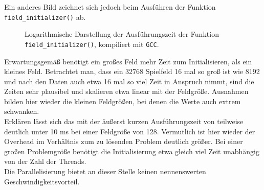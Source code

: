 \documentclass[german,plainarticle,hyperref,utf8]{zihpub}
\begin{document}
	Ein anderes Bild zeichnet sich jedoch beim Ausführen der Funktion \texttt{field\_initializer()} ab.
	\begin{figure}[h]
		\begin{center}
			
		\end{center}
		\caption{Logarithmische Darstellung der Ausführungszeit der Funktion \texttt{field\_initializer()}, kompiliert mit \texttt{GCC}.}
	\end{figure}
	\newline
	Erwartungsgemäß benötigt ein großes Feld mehr Zeit zum Initialisieren, als ein kleines Feld. Betrachtet man, dass ein 32768 Spielfeld 16 mal so groß ist wie 8192 und nach den Daten auch etwa 16 mal so viel Zeit in Anspruch nimmt, sind die Zeiten sehr plausibel und skalieren etwa linear mit der Feldgröße. Ausnahmen bilden hier wieder die kleinen Feldgrößen, bei denen die Werte auch extrem schwanken.\\
	Erklären lässt sich das mit der äußerst kurzen Ausführungszeit von teilweise deutlich unter 10 ms bei einer Feldgröße von 128. Vermutlich ist hier wieder der Overhead im Verhältnis zum zu lösenden Problem deutlich größer.
	Bei einer großen Problemgröße benötigt die Initialisierung etwa gleich viel Zeit unabhängig von der Zahl der Threads.\\
	Die Parallelisierung bietet an dieser Stelle keinen nennenswerten Geschwindigkeitsvorteil.
	\newpage
\end{document}
